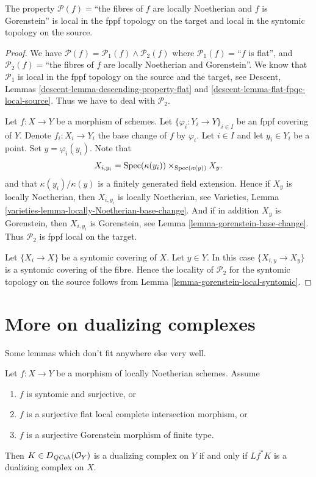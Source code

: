 \begin{lemma}
\label{lemma-gorenstein-local-source-and-target}
The property
$\mathcal{P}(f)=$``the fibres of $f$ are locally Noetherian and $f$ is
Gorenstein'' is local in the fppf topology on the target and
local in the syntomic topology on the source.
\end{lemma}

\begin{proof}
We have
$\mathcal{P}(f) =
\mathcal{P}_1(f) \wedge \mathcal{P}_2(f)$
where
$\mathcal{P}_1(f)=$``$f$ is flat'', and
$\mathcal{P}_2(f)=$``the fibres of $f$ are locally Noetherian
and Gorenstein''.
We know that $\mathcal{P}_1$ is
local in the fppf topology on the source and the target, see
Descent, Lemmas \ref{descent-lemma-descending-property-flat} and
\ref{descent-lemma-flat-fpqc-local-source}. Thus we have to deal
with $\mathcal{P}_2$.

\medskip\noindent
Let $f : X \to Y$ be a morphism of schemes.
Let $\{\varphi_i : Y_i \to Y\}_{i \in I}$ be an fppf covering of $Y$.
Denote $f_i : X_i \to Y_i$ the base change of $f$ by $\varphi_i$.
Let $i \in I$ and let $y_i \in Y_i$ be a point.
Set $y = \varphi_i(y_i)$. Note that
$$
X_{i, y_i} = \mathop{\mathrm{Spec}}(\kappa(y_i)) \times_{\mathop{\mathrm{Spec}}(\kappa(y))} X_y.
$$
and that $\kappa(y_i)/\kappa(y)$ is a finitely generated field
extension. Hence if $X_y$ is locally Noetherian, then
$X_{i, y_i}$ is locally Noetherian, see
Varieties, Lemma \ref{varieties-lemma-locally-Noetherian-base-change}.
And if in addition $X_y$ is Gorenstein,
then $X_{i, y_i}$ is Gorenstein, see
Lemma \ref{lemma-gorenstein-base-change}.
Thus $\mathcal{P}_2$ is fppf local on the target.

\medskip\noindent
Let $\{X_i \to X\}$ be a syntomic covering of $X$.
Let $y \in Y$. In this case $\{X_{i, y} \to X_y\}$ is a
syntomic covering of the fibre. Hence the locality of $\mathcal{P}_2$
for the syntomic topology on the source follows from
Lemma \ref{lemma-gorenstein-local-syntomic}.
\end{proof}




\section{More on dualizing complexes}
\label{section-more-dualizing}

\noindent
Some lemmas which don't fit anywhere else very well.

\begin{lemma}
\label{lemma-descent-ascent}
Let $f : X \to Y$ be a morphism of locally Noetherian schemes. Assume
\begin{enumerate}
\item $f$ is syntomic and surjective, or
\item $f$ is a surjective flat local complete intersection morphism, or
\item $f$ is a surjective Gorenstein morphism of finite type.
\end{enumerate}
Then $K \in D_{\mathit{QCoh}}(\mathcal{O}_Y)$ is a dualizing complex on $Y$ if and only
if $Lf^*K$ is a dualizing complex on $X$.
\end{lemma}

